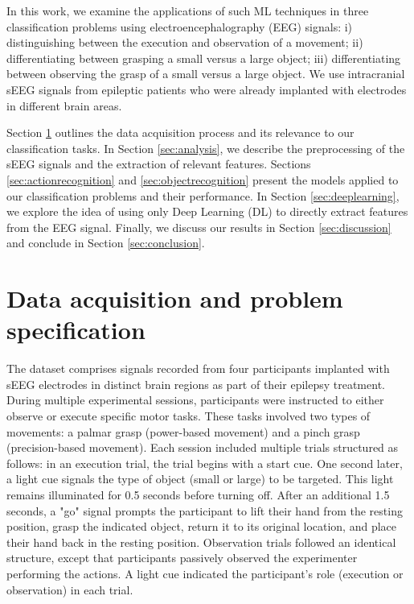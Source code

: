 \documentclass[10pt,conference,compsocconf]{IEEEtran}
\begin{document}
In this work, we examine the applications of such ML techniques in three classification problems using electroencephalography (EEG) signals: i) distinguishing between the execution and observation of a movement; ii) differentiating between grasping a small versus a large object; iii) differentiating between observing the grasp of a small versus a large object. We use intracranial sEEG signals from epileptic patients who were already implanted with electrodes in different brain areas.

Section \ref{sec:problem} outlines the data acquisition process and its relevance to our classification tasks. In Section \ref{sec:analysis}, we describe the preprocessing of the sEEG signals and the extraction of relevant features. Sections \ref{sec:actionrecognition} and \ref{sec:objectrecognition} present the models applied to our classification problems and their performance. In Section \ref{sec:deeplearning}, we explore the idea of using only Deep Learning (DL) to directly extract features from the EEG signal. Finally, we discuss our results in Section \ref{sec:discussion} and conclude in Section \ref{sec:conclusion}.

\section{Data acquisition and problem specification}
\label{sec:problem}
The dataset comprises signals recorded from four participants implanted with sEEG electrodes in distinct brain regions as part of their epilepsy treatment. During multiple experimental sessions, participants were instructed to either observe or execute specific motor tasks. These tasks involved two types of movements: a palmar grasp (power-based movement) and a pinch grasp (precision-based movement). Each session included multiple trials structured as follows: in an execution trial, the trial begins with a start cue. One second later, a light cue signals the type of object (small or large) to be targeted. This light remains illuminated for 0.5 seconds before turning off. After an additional 1.5 seconds, a "go" signal prompts the participant to lift their hand from the resting position, grasp the indicated object, return it to its original location, and place their hand back in the resting position. Observation trials followed an identical structure, except that participants passively observed the experimenter performing the actions. A light cue indicated the participant's role (execution or observation) in each trial.
\end{document}
